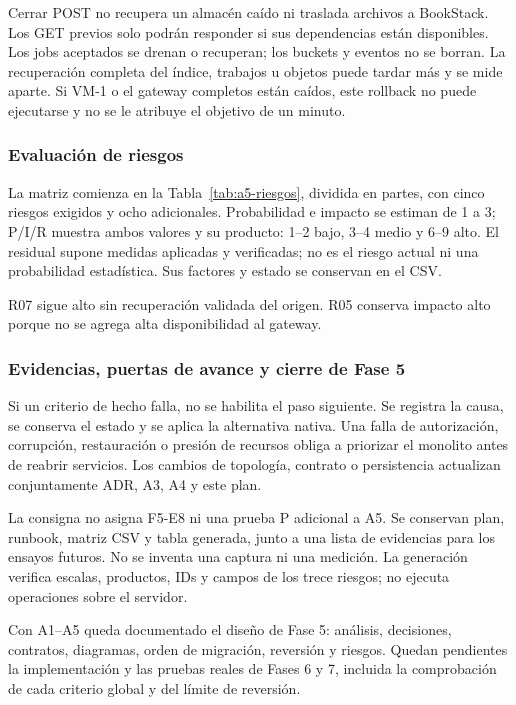 Cerrar POST no recupera un almacén caído ni traslada archivos a BookStack.
Los GET previos solo podrán responder si sus dependencias están disponibles.
Los jobs aceptados se drenan o recuperan; los buckets y eventos no se borran.
La recuperación completa del índice, trabajos u objetos puede tardar más y
se mide aparte. Si VM-1 o el gateway completos están caídos, este rollback
no puede ejecutarse y no se le atribuye el objetivo de un minuto.

\subsubsection{Evaluación de riesgos}

La matriz comienza en la Tabla~\ref{tab:a5-riesgos}, dividida en partes,
con cinco riesgos exigidos y ocho adicionales. Probabilidad e impacto se
estiman de 1 a 3; P/I/R muestra ambos valores y su producto: 1--2 bajo,
3--4 medio y 6--9 alto. El residual supone medidas aplicadas y verificadas;
no es el riesgo actual ni una probabilidad estadística. Sus factores y estado
se conservan en el CSV.

R07 sigue alto sin recuperación validada del origen. R05 conserva impacto
alto porque no se agrega alta disponibilidad al gateway.



\subsubsection{Evidencias, puertas de avance y cierre de Fase 5}

Si un criterio de hecho falla, no se habilita el paso siguiente. Se registra
la causa, se conserva el estado y se aplica la alternativa nativa. Una falla
de autorización, corrupción, restauración o presión de recursos obliga a
priorizar el monolito antes de reabrir servicios. Los cambios de topología,
contrato o persistencia actualizan conjuntamente ADR, A3, A4 y este plan.

La consigna no asigna F5-E8 ni una prueba P adicional a A5. Se conservan
plan, runbook, matriz CSV y tabla generada, junto a una lista de evidencias
para los ensayos futuros. No se inventa una captura ni una medición.
La generación verifica escalas, productos, IDs y campos de los trece riesgos;
no ejecuta operaciones sobre el servidor.

Con A1--A5 queda documentado el diseño de Fase 5: análisis, decisiones,
contratos, diagramas, orden de migración, reversión y riesgos. Quedan
pendientes la implementación y las pruebas reales de Fases 6 y 7, incluida
la comprobación de cada criterio global y del límite de reversión.
